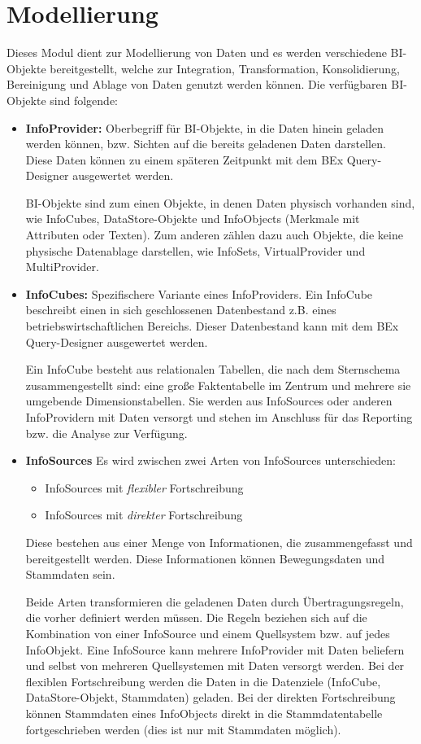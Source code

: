 \section{Modellierung} Dieses Modul dient zur Modellierung von Daten und es werden verschiedene BI-Objekte bereitgestellt, welche zur Integration, Transformation, Konsolidierung, Bereinigung und Ablage von Daten genutzt werden können. Die verfügbaren BI-Objekte sind folgende:
\begin{itemize}
\item \textbf{InfoProvider:}
Oberbegriff für BI-Objekte, in die Daten hinein geladen werden können, bzw. Sichten auf die bereits geladenen Daten darstellen. Diese Daten können zu einem späteren Zeitpunkt mit dem BEx Query-Designer ausgewertet werden.

BI-Objekte sind zum einen Objekte, in denen Daten physisch vorhanden sind, wie InfoCubes, DataStore-Objekte und InfoObjects (Merkmale mit Attributen oder Texten). Zum anderen zählen dazu auch Objekte, die keine physische Datenablage darstellen, wie InfoSets, VirtualProvider und MultiProvider.

\item \textbf{InfoCubes:}
Spezifischere Variante eines InfoProviders.
Ein InfoCube beschreibt einen in sich geschlossenen Datenbestand z.B. eines betriebswirtschaftlichen Bereichs. Dieser Datenbestand kann mit dem BEx Query-Designer ausgewertet werden.

Ein InfoCube besteht aus relationalen Tabellen, die nach dem Sternschema zusammengestellt sind: eine große Faktentabelle im Zentrum und mehrere sie umgebende Dimensionstabellen.
Sie werden aus InfoSources oder anderen InfoProvidern mit Daten versorgt und stehen im Anschluss für das Reporting bzw. die Analyse zur Verfügung.

\item \textbf{InfoSources}
Es wird zwischen zwei Arten von InfoSources unterschieden:
\begin{itemize}
\item InfoSources mit \textit{flexibler} Fortschreibung
\item InfoSources mit \textit{direkter} Fortschreibung
\end{itemize}

Diese bestehen aus einer Menge von Informationen, die zusammengefasst und bereitgestellt werden. Diese Informationen können Bewegungsdaten und Stammdaten sein.

Beide Arten transformieren die geladenen Daten durch Übertragungsregeln, die vorher definiert werden müssen. Die Regeln beziehen sich auf die Kombination von einer InfoSource und einem Quellsystem bzw. auf jedes InfoObjekt. Eine InfoSource kann mehrere InfoProvider mit Daten beliefern und selbst von mehreren Quellsystemen mit Daten versorgt werden.
Bei der flexiblen Fortschreibung werden die Daten in die Datenziele (InfoCube, DataStore-Objekt, Stammdaten) geladen.
Bei der direkten Fortschreibung können Stammdaten eines InfoObjects direkt in die Stammdatentabelle fortgeschrieben werden (dies ist nur mit Stammdaten möglich).

\end{itemize}
